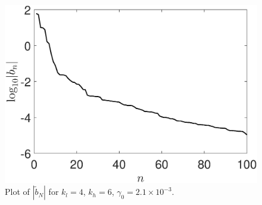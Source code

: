 \documentclass[a4paper,11pt]{article}
\begin{document}
\begin{figure}[!h]
\centering
\includegraphics[width=.7\textwidth]{dmd_mags_K_128_Lx_128_tf_1pt5e4}
\caption{Plot of $\left|\tilde{b}_{N}\right|$ for $k_{l}=4$, $k_{h}=6$, $\gamma_{0}=2.1\times 10^{-3}$.}
\label{fig:bmmagslf}
\end{figure}
\end{document}
